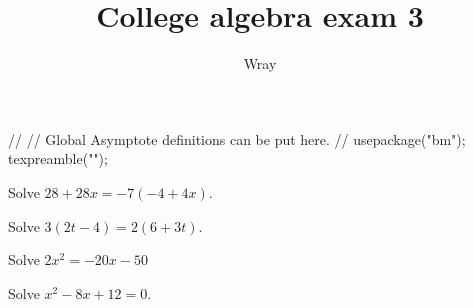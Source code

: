 \documentclass[addpoints, 12pt]{exam}
\title{College algebra exam 3}
\author{Wray}
\begin{document}
\begin{asydef}
//
// Global Asymptote definitions can be put here.
//
usepackage("bm");
texpreamble("\def\V#1{\bm{#1}}");
\end{asydef}



\bigskip

             
\bigskip
\bigskip

\smallskip

\begin{questions}

\question[5]
Solve $28 + 28x = -7 \left( -4 + 4x \right)$.


\question[5]
Solve $3 \left( 2t - 4 \right) = 2 \left( 6 + 3t \right)$.


\newpage

\question[5]
Solve $2x^2 = - 20x - 50$


\question[5]
Solve $x^2 - 8x + 12 = 0$.


\end{questions}
\end{document}
